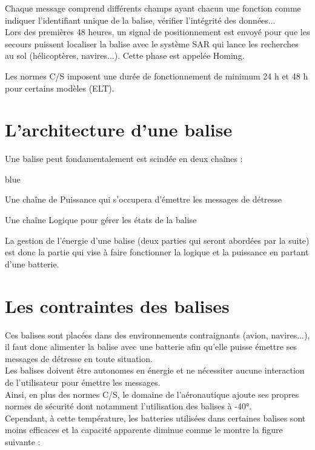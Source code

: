 Chaque message comprend différents champs ayant chacun une fonction comme indiquer l'identifiant unique de la balise, vérifier l'intégrité des données...\\

Lors des premières 48 heures, un signal de positionnement est envoyé pour que les secours puissent localiser la balise avec le système SAR qui lance les recherches au sol (hélicoptères, navires...). Cette phase est appelée Homing.

Les normes C/S imposent une durée de fonctionnement de minimum 24 h et 48 h pour certains modèles (ELT).

\section{L'architecture d'une balise}

Une balise peut fondamentalement est scindée en deux chaînes : 

\begin{items}{blue}{\Circle}
    \item Une chaîne de Puissance qui s'occupera d'émettre les messages de détresse
    \item Une chaîne Logique pour gérer les états de la balise
\end{items}


La gestion de l'énergie d'une balise (deux parties qui seront abordées par la suite) est donc la partie qui vise à faire fonctionner la logique et la puissance en partant d'une batterie.


\section{Les contraintes des balises}

Ces balises sont placées dans des environnements contraignants (avion, navires...), il faut donc alimenter la balise avec une batterie afin qu'elle puisse émettre ses messages de détresse en toute situation.\\Les balises doivent être autonomes en énergie et ne nécessiter aucune interaction de l'utilisateur pour émettre les messages.\\

Ainsi, en plus des normes C/S, le domaine de l'aéronautique ajoute ses propres normes de sécurité dont notamment l'utilisation des balises à -40°.\\
Cependant, à cette température, les batteries utilisées dans certaines balises sont moins efficaces et la capacité apparente diminue comme le montre la figure suivante :\\

